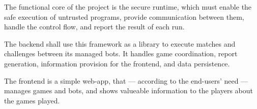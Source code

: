 	The functional core of the project is the secure runtime, which must enable the safe execution of untrusted programs, provide communication between them, handle the control flow, and report the result of each run.
	
	The backend shall use this framework as a library to execute matches and challenges between its managed bots. It handles game coordination, report generation, information provision for the frontend, and data persistence.
	
	The frontend is a simple web-app, that --- according to the end-users' need --- manages games and bots, and shows valueable information to the players about the games played.

%













